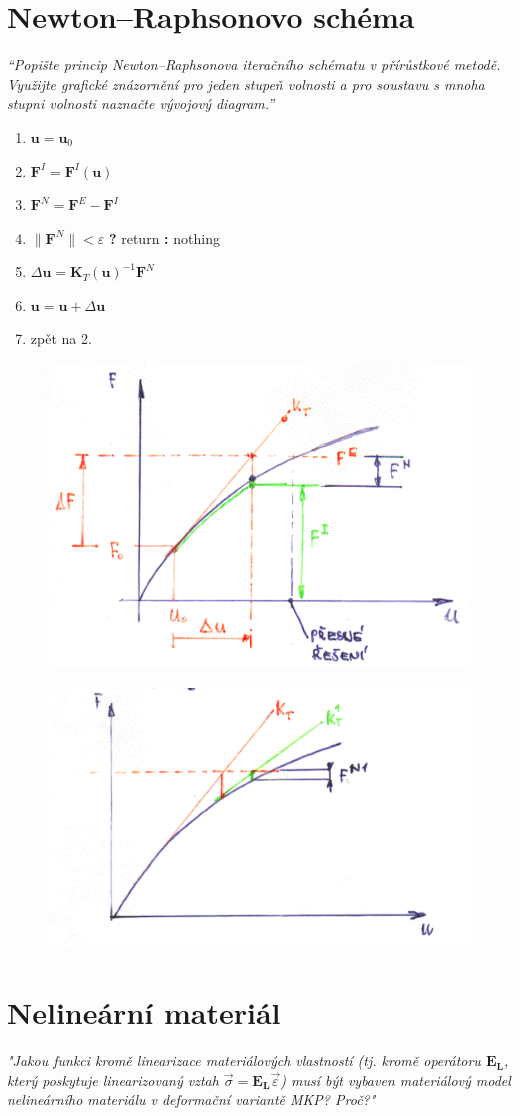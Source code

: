 \documentclass{article}
\begin{document}
	\section{Newton–Raphsonovo schéma}
	\emph{``Popište princip Newton–Raphsonova iteračního schématu v přírůstkové metodě. Využijte grafické znázornění pro jeden stupeň volnosti a pro soustavu s mnoha stupni volnosti naznačte vývojový diagram.''}
	\begin{enumerate}
		\item $\bm{u} = \bm{u}_0$
		\item $\bm{F}^I = \bm{F}^I(\bm{u})$
		\item $\bm{F}^N = \bm{F}^E - \bm{F}^I$
		\item $\|\bm{F}^N\| < \varepsilon$ \textbf{?} return \textbf{:} nothing
		\item $\Delta \bm{u} = \bm{K}_T(\bm{u})^{-1} \bm{F}^N$
		\item $\bm{u} = \bm{u} + \Delta \bm{u}$
		\item zpět na 2.
	\end{enumerate}
	\begin{figure}[h!]
		\centering
		\includegraphics[width=.5\linewidth]{figs/NR1.png}
	\end{figure}
	\begin{figure}[h!]
		\centering
		\includegraphics[width=.5\linewidth]{figs/NR2.png}
	\end{figure}

	\pagebreak
	\section{Nelineární materiál}
	\emph{"Jakou funkci kromě linearizace materiálových vlastností (tj. kromě operátoru $\mathbf{E_L}$, který poskytuje linearizovaný vztah $\vec{\sigma} = \mathbf{E_L}\vec{\varepsilon}$) musí být vybaven materiálový model nelineárního materiálu v deformační variantě MKP? Proč?"}
	
\end{document}
